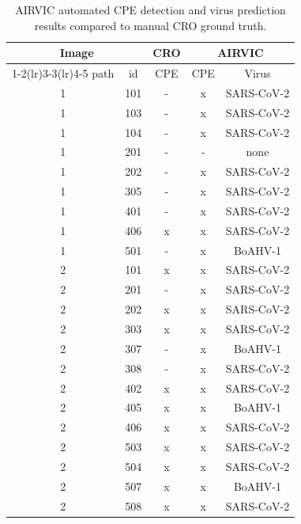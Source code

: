 \begin{table}[htbp]
\centering
\small
\setlength{\tabcolsep}{8pt}
\caption{AIRVIC automated CPE detection and virus prediction results compared to manual CRO ground truth.}
\label{tab:airvic-results}

\begin{tabular}{ccccc}
\toprule
\multicolumn{2}{c}{\textbf{Image}} 
& \textbf{CRO} 
& \multicolumn{2}{c}{\textbf{AIRVIC}} \\
\cmidrule(lr){1-2}\cmidrule(lr){3-3}\cmidrule(lr){4-5}
path & id 
& CPE 
& CPE & Virus \\
\midrule
1 & 101 & - & x & SARS-CoV-2 \\
1 & 103 & - & x & SARS-CoV-2 \\
1 & 104 & - & x & SARS-CoV-2 \\
1 & 201 & - & - & none \\
1 & 202 & - & x & SARS-CoV-2 \\
1 & 305 & - & x & SARS-CoV-2 \\
1 & 401 & - & x & SARS-CoV-2 \\
1 & 406 & x & x & SARS-CoV-2 \\
1 & 501 & - & x & BoAHV-1 \\
2 & 101 & x & x & SARS-CoV-2 \\
2 & 201 & - & x & SARS-CoV-2 \\
2 & 202 & x & x & SARS-CoV-2 \\
2 & 303 & x & x & SARS-CoV-2 \\
2 & 307 & - & x & BoAHV-1 \\
2 & 308 & - & x & SARS-CoV-2 \\
2 & 402 & x & x & SARS-CoV-2 \\
2 & 405 & x & x & BoAHV-1 \\
2 & 406 & x & x & SARS-CoV-2 \\
2 & 503 & x & x & SARS-CoV-2 \\
2 & 504 & x & x & SARS-CoV-2 \\
2 & 507 & x & x & BoAHV-1 \\
2 & 508 & x & x & SARS-CoV-2 \\
\bottomrule
\end{tabular}
\end{table}